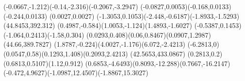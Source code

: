 {    \rcurveto(-0.0667,-1.212)(-0.14,-2.316)(-0.2067,-3.2947)
    \rcurveto(-0.0827,0.0053)(-0.168,0.0133)(-0.244,0.0133)
    \rlineto(0.0027,0.0027)
    \rcurveto(-1.3053,0.1053)(-2.448,-0.6187)(-1.8933,-1.5293)
    \moveto(44.8453,392.312)
    \rcurveto(0.4987,-0.584)(1.0053,-1.124)(1.4893,-1.6027)
    \rcurveto(-0.5387,0.1453)(-1.064,0.2413)(-1.58,0.304)
    \rcurveto(0.0293,0.408)(0.06,0.8467)(0.0907,1.2987)
    \moveto(44.66,389.7827)
    \rcurveto(1.8787,-0.224)(4.0027,-1.176)(6.072,-2.4213)
    \rlineto(-6.2813,0)
    \rcurveto(0.0547,0.58)(0.1293,1.408)(0.2093,2.4213)
    \moveto(42.5653,433.0867)
    \rcurveto(0.2813,0.2)(0.6813,0.5107)(1.12,0.912)
    \rcurveto(0.6853,-4.6493)(0.8093,-12.288)(0.7667,-16.2147)
    \rcurveto(-0.472,4.9627)(-1.0987,12.4507)(-1.8867,15.3027)
}